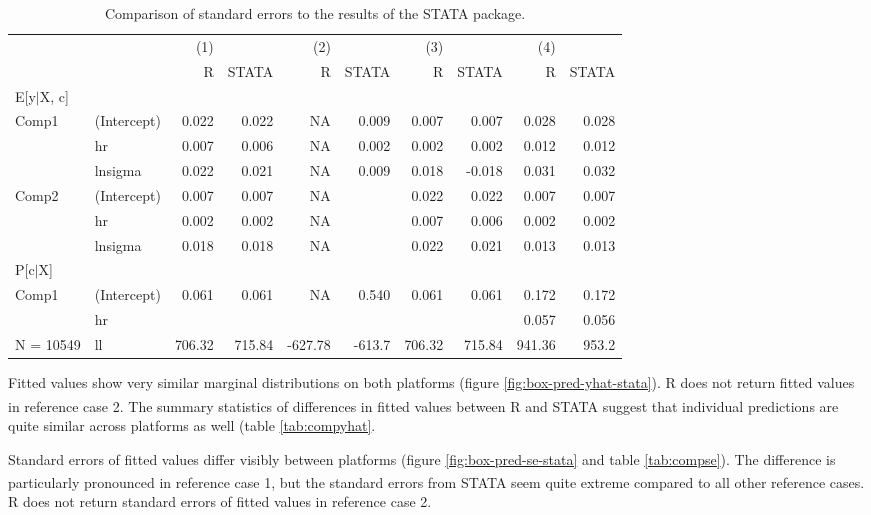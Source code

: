 \documentclass[
]{article}
\begin{document}
\begin{table}[!ht]
\centering
\caption{Comparison of standard errors to the results of the STATA package.} 
\label{tab:tab-compse-stata}
\begin{tabular}{llrrrrrrrr}
  \hline
  &  & (1) &  & (2) &  & (3) &  & (4) &  \\ 
   &  & R & STATA & R & STATA & R & STATA & R & STATA \\ 
   \hline
E[y$|$X, c] &  &  &  &  &  &  &  &  &  \\ 
   \hline
Comp1 & (Intercept) & 0.022 & 0.022 & NA & 0.009 & 0.007 & 0.007 & 0.028 & 0.028 \\ 
   & hr & 0.007 & 0.006 & NA & 0.002 & 0.002 & 0.002 & 0.012 & 0.012 \\ 
   & lnsigma & 0.022 & 0.021 & NA & 0.009 & 0.018 & -0.018 & 0.031 & 0.032 \\ 
  Comp2 & (Intercept) & 0.007 & 0.007 & NA &  & 0.022 & 0.022 & 0.007 & 0.007 \\ 
   & hr & 0.002 & 0.002 & NA &  & 0.007 & 0.006 & 0.002 & 0.002 \\ 
   & lnsigma & 0.018 & 0.018 & NA &  & 0.022 & 0.021 & 0.013 & 0.013 \\ 
   \hline
P[c$|$X] &  &  &  &  &  &  &  &  &  \\ 
   \hline
Comp1 & (Intercept) & 0.061 & 0.061 & NA & 0.540 & 0.061 & 0.061 & 0.172 & 0.172 \\ 
   & hr &  &  &  &  &  &  & 0.057 & 0.056 \\ 
   \hline
N = 10549 & ll & 706.32 & 715.84 & -627.78 & -613.7 & 706.32 & 715.84 & 941.36 & 953.2 \\ 
  \end{tabular}
\end{table}

Fitted values show very similar marginal distributions on both platforms (figure \ref{fig:box-pred-yhat-stata}). R does not return fitted values in reference case 2. The summary statistics of differences in fitted values between R and STATA\textsuperscript{\textregistered} suggest that individual predictions are quite similar across platforms as well (table \ref{tab:compyhat}.

Standard errors of fitted values differ visibly between platforms (figure \ref{fig:box-pred-se-stata} and table \ref{tab:compse}). The difference is particularly pronounced in reference case 1, but the standard errors from STATA\textsuperscript{\textregistered} seem quite extreme compared to all other reference cases. R does not return standard errors of fitted values in reference case 2.
\end{document}

